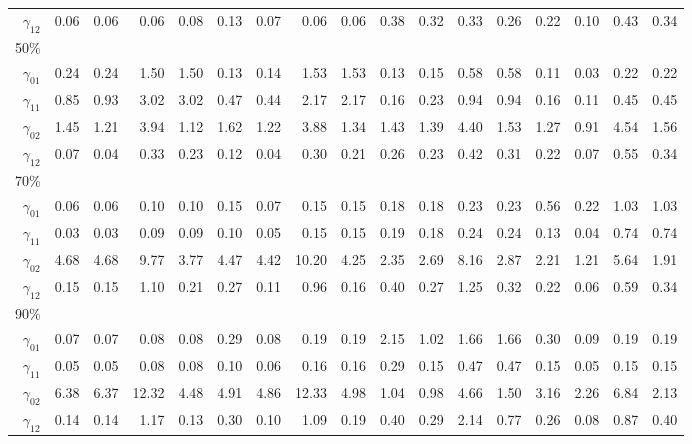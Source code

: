 \documentclass[useAMS,usenatbib,referee]{biom}
\begin{document}
\begin{table}
\begin{tabular}{rrrrrrrrrrrrrrrrr}
$\gamma_{12}$ & 0.06 & 0.06 & 0.06 & 0.08 & 0.13 & 0.07 & 0.06 & 0.06 & 0.38 & 0.32 & 0.33 & 0.26 & 0.22 & 0.10 & 0.43 & 0.34 \\
50\% \\
$\gamma_{01}$ & 0.24 & 0.24 & 1.50 & 1.50 & 0.13 & 0.14 & 1.53 & 1.53 & 0.13 & 0.15 & 0.58 & 0.58 & 0.11 & 0.03 & 0.22 & 0.22 \\
$\gamma_{11}$  & 0.85 & 0.93 & 3.02 & 3.02 & 0.47 & 0.44 & 2.17 & 2.17 & 0.16 & 0.23 & 0.94 & 0.94 & 0.16 & 0.11 & 0.45 & 0.45 \\
$\gamma_{02}$  & 1.45 & 1.21 & 3.94 & 1.12 & 1.62 & 1.22 & 3.88 & 1.34 & 1.43 & 1.39 & 4.40 & 1.53 & 1.27 & 0.91 & 4.54 & 1.56 \\
$\gamma_{12}$  & 0.07 & 0.04 & 0.33 & 0.23 & 0.12 & 0.04 & 0.30 & 0.21 & 0.26 & 0.23 & 0.42 & 0.31 & 0.22 & 0.07 & 0.55 & 0.34 \\
70\% \\
$\gamma_{01}$  & 0.06 & 0.06 & 0.10 & 0.10 & 0.15 & 0.07 & 0.15 & 0.15 & 0.18 & 0.18 & 0.23 & 0.23 & 0.56 & 0.22 & 1.03 & 1.03 \\
$\gamma_{11}$  & 0.03 & 0.03 & 0.09 & 0.09 & 0.10 & 0.05 & 0.15 & 0.15 & 0.19 & 0.18 & 0.24 & 0.24 & 0.13 & 0.04 & 0.74 & 0.74 \\
$\gamma_{02}$  & 4.68 & 4.68 & 9.77 & 3.77 & 4.47 & 4.42 & 10.20 & 4.25 & 2.35 & 2.69 & 8.16 & 2.87 & 2.21 & 1.21 & 5.64 & 1.91 \\
$\gamma_{12}$  & 0.15 & 0.15 & 1.10 & 0.21 & 0.27 & 0.11 & 0.96 & 0.16 & 0.40 & 0.27 & 1.25 & 0.32 & 0.22 & 0.06 & 0.59 & 0.34 \\
90\% \\
$\gamma_{01}$  & 0.07 & 0.07 & 0.08 & 0.08 & 0.29 & 0.08 & 0.19 & 0.19 & 2.15 & 1.02 & 1.66 & 1.66 & 0.30 & 0.09 & 0.19 & 0.19 \\
$\gamma_{11}$  & 0.05 & 0.05 & 0.08 & 0.08 & 0.10 & 0.06 & 0.16 & 0.16 & 0.29 & 0.15 & 0.47 & 0.47 & 0.15 & 0.05 & 0.15 & 0.15 \\
$\gamma_{02}$  & 6.38 & 6.37 & 12.32 & 4.48 & 4.91 & 4.86 & 12.33 & 4.98 & 1.04 & 0.98 & 4.66 & 1.50 & 3.16 & 2.26 & 6.84 & 2.13 \\
$\gamma_{12}$  & 0.14 & 0.14 & 1.17 & 0.13 & 0.30 & 0.10 & 1.09 & 0.19 & 0.40 & 0.29 & 2.14 & 0.77 & 0.26 & 0.08 & 0.87 & 0.40 \\
\hline
  \end{tabular}

\end{table}
\end{document}
